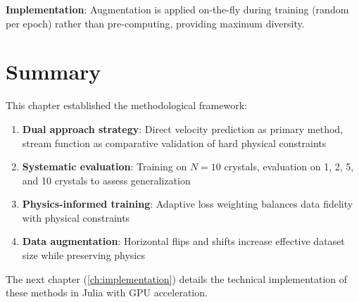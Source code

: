 \textbf{Implementation}: Augmentation is applied on-the-fly during training (random per epoch) rather than pre-computing, providing maximum diversity.

\section{Summary}
\label{sec:methodology_summary}

This chapter established the methodological framework:

\begin{enumerate}
    \item \textbf{Dual approach strategy}: Direct velocity prediction as primary method, stream function as comparative validation of hard physical constraints
    
    \item \textbf{Systematic evaluation}: Training on $N=10$ crystals, evaluation on 1, 2, 5, and 10 crystals to assess generalization
    
    \item \textbf{Physics-informed training}: Adaptive loss weighting balances data fidelity with physical constraints
    
    \item \textbf{Data augmentation}: Horizontal flips and shifts increase effective dataset size while preserving physics
\end{enumerate}

The next chapter (\ref{ch:implementation}) details the technical implementation of these methods in Julia with GPU acceleration.